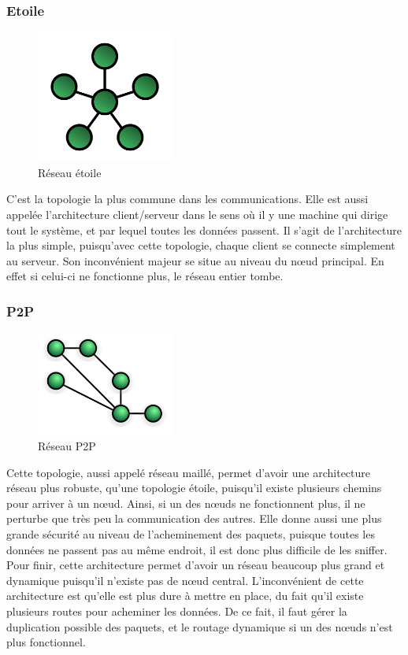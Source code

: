 	    \subsubsection{Etoile}
\begin{figure}[!ht]
         \centering
         \includegraphics[width=0.4\textwidth]{img/StarNetwork.png}
         \caption{Réseau étoile}
         \label{StarNetwork}
\end{figure}
C'est la topologie la plus commune dans les communications. Elle est aussi appelée l'architecture client/serveur dans le sens où il y une machine qui dirige tout le système, et par lequel toutes les données passent. Il s'agit de l'architecture la plus simple, puisqu'avec cette topologie, chaque client se connecte simplement au serveur. Son inconvénient majeur se situe au niveau du nœud principal. En effet si celui-ci ne fonctionne plus, le réseau entier tombe.

	    \subsubsection{P2P}
\begin{figure}[!ht]
         \centering
         \includegraphics[width=0.4\textwidth]{img/NetworkTopology-Mesh.png}
         \caption{Réseau P2P}
         \label{MeshNetwork}
\end{figure}
Cette topologie, aussi appelé réseau maillé, permet d'avoir une architecture réseau plus robuste, 
qu'une topologie étoile, puisqu'il existe plusieurs chemins pour arriver à un nœud. Ainsi, si un des 
nœuds ne fonctionnent plus, il ne perturbe que très peu la communication des autres. Elle donne 
aussi une plus grande sécurité au niveau de l'acheminement des paquets, puisque toutes les données 
ne passent pas au même endroit, il est donc plus difficile de les sniffer. Pour finir, cette 
architecture permet d'avoir un réseau beaucoup plus grand et dynamique puisqu'il n'existe pas de 
nœud central. L'inconvénient de cette architecture est qu'elle est plus dure à mettre en place, du 
fait qu'il existe plusieurs routes pour acheminer les données. De ce fait, il faut gérer la 
duplication possible des paquets, et le routage dynamique si un des nœuds n'est plus fonctionnel.

